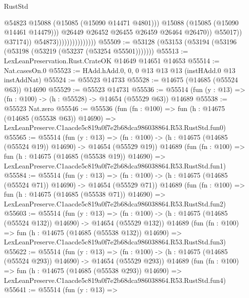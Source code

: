 \begin{lexlean}{RustStd}
\begin{coremodule}
                                                  @54823
                                                  @15088
                                                  (@15085 (@15090 @14471 @4801)))
                                                @15088
                                                (@15085 (@15090 @14461 @14479)))
                                              @26449
                                              @26452
                                              @26455
                                              @26459
                                              @26464
                                              @26470))
                                          @55017))
                                      @37174))
                                  @54873)))))))))))))))
@55509 := @53128 (@53153 (@53194 (@53196 (@53198 (@53219 (@53237 (@53254 @55501)))))))
@55513 := LexLeanPreservation.Rust.CrateOK @14649 @14651 @14653
@55514 := Nat.casesOn.{0}
@55523 := HAdd.hAdd.{0, 0, 0} @13 @13 @13 (instHAdd.{0} @13 instAddNat)
@55524 := @55523 @14733
@55528 := @14675 (@14685 (@55524 @63)) @14690
@55529 := @55523 @14731
@55536 := @55514 (fun (y : @13) => (fn : @100) -> (h : @55528) -> @14654 (@55529 @63)) @14689
@55538 := @55523 Nat.zero
@55546 := @55536
    (fun (fn : @100) =>
    fun (h : @14675 (@14685 (@55538 @63)) @14690) =>
    LexLeanPreserve.C1aacde5c819a0f7e2b68dca986038864.R53.RustStd.fun0)
@55565 := @55514
    (fun (y : @13) =>
    (fn : @100) -> (h : @14675 (@14685 (@55524 @19)) @14690) -> @14654 (@55529 @19))
    @14689
    (fun (fn : @100) =>
    fun (h : @14675 (@14685 (@55538 @19)) @14690) =>
    LexLeanPreserve.C1aacde5c819a0f7e2b68dca986038864.R53.RustStd.fun1)
@55584 := @55514
    (fun (y : @13) =>
    (fn : @100) -> (h : @14675 (@14685 (@55524 @71)) @14690) -> @14654 (@55529 @71))
    @14689
    (fun (fn : @100) =>
    fun (h : @14675 (@14685 (@55538 @71)) @14690) =>
    LexLeanPreserve.C1aacde5c819a0f7e2b68dca986038864.R53.RustStd.fun2)
@55603 := @55514
    (fun (y : @13) =>
    (fn : @100) -> (h : @14675 (@14685 (@55524 @132)) @14690) -> @14654 (@55529 @132))
    @14689
    (fun (fn : @100) =>
    fun (h : @14675 (@14685 (@55538 @132)) @14690) =>
    LexLeanPreserve.C1aacde5c819a0f7e2b68dca986038864.R53.RustStd.fun3)
@55622 := @55514
    (fun (y : @13) =>
    (fn : @100) -> (h : @14675 (@14685 (@55524 @293)) @14690) -> @14654 (@55529 @293))
    @14689
    (fun (fn : @100) =>
    fun (h : @14675 (@14685 (@55538 @293)) @14690) =>
    LexLeanPreserve.C1aacde5c819a0f7e2b68dca986038864.R53.RustStd.fun4)
@55641 := @55514
    (fun (y : @13) =>

\end{coremodule}
\end{lexlean}
